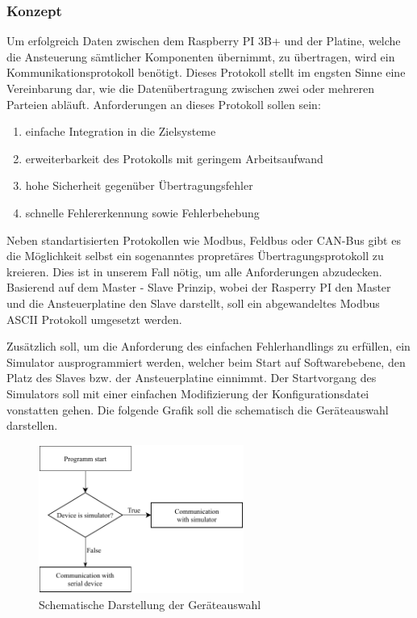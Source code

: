 \subsubsection{Konzept}
Um erfolgreich Daten zwischen dem Raspberry PI 3B+ und der Platine, welche die Ansteuerung sämtlicher Komponenten übernimmt, zu übertragen, wird ein Kommunikationsprotokoll benötigt.
Dieses Protokoll stellt im engsten Sinne eine Vereinbarung dar, wie die Datenübertragung zwischen zwei oder mehreren Parteien abläuft.
Anforderungen an dieses Protokoll sollen sein:
\begin{enumerate}
    \item einfache Integration in die Zielsysteme
    \item erweiterbarkeit des Protokolls mit geringem Arbeitsaufwand
    \item hohe Sicherheit gegenüber Übertragungsfehler
    \item schnelle Fehlererkennung sowie Fehlerbehebung
\end{enumerate}
Neben standartisierten Protokollen wie Modbus, Feldbus oder CAN-Bus gibt es die Möglichkeit selbst ein sogenanntes propretäres Übertragungsprotokoll zu kreieren.
Dies ist in unserem Fall nötig, um alle Anforderungen abzudecken.
Basierend auf dem Master - Slave Prinzip, wobei der Rasperry PI den Master und die Ansteuerplatine den Slave darstellt, soll ein abgewandeltes Modbus ASCII Protokoll umgesetzt werden.

Zusätzlich soll, um die Anforderung des einfachen Fehlerhandlings zu erfüllen, ein Simulator ausprogrammiert werden, welcher beim Start auf Softwarebebene, den Platz des Slaves bzw. der Ansteuerplatine einnimmt.
Der Startvorgang des Simulators soll mit einer einfachen Modifizierung der Konfigurationsdatei vonstatten gehen.
Die folgende Grafik soll die schematisch die Geräteauswahl darstellen.
\begin{figure}[H]
    \centering
    \includegraphics[width=0.6\textwidth]{fig/ainf/DeviceSelection}
    \caption{Schematische Darstellung der Geräteauswahl}
    \label{deviceSelection}
\end{figure}
